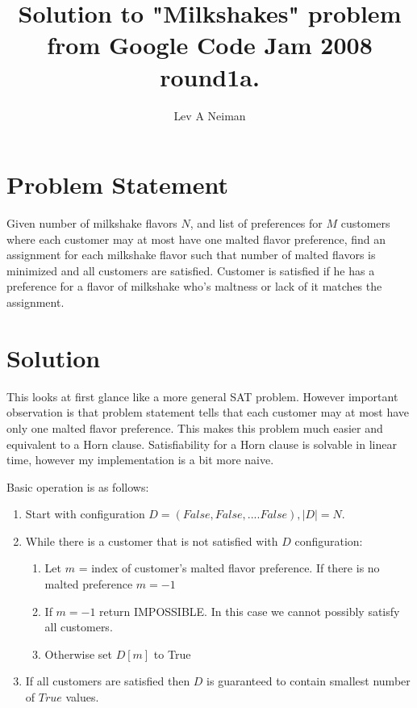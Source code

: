 \documentclass[11pt]{article}
\begin{document}
\title{Solution to "Milkshakes"\cite{milkshakes} problem from Google Code Jam 2008 round1a.}
\author{Lev A Neiman}
\maketitle

\section{Problem Statement}

Given number of milkshake flavors $N$, and list of preferences for $M$ customers where each customer may at most have one malted flavor preference, find an assignment for each milkshake flavor such that number of malted flavors is minimized and all customers are satisfied.  Customer is satisfied if he has a preference for a flavor of milkshake who's maltness or lack of it matches the assignment.  

\section{Solution}

This looks at first glance like a more general SAT problem\cite{SAT}.  However important observation is that problem statement tells that each customer may at most have only one malted flavor preference.  This makes this problem much easier and equivalent to a Horn clause\cite{horn}.  Satisfiability for a Horn clause is solvable in linear time, however my implementation is a bit more naive.

Basic operation is as follows:
\begin{enumerate}
\item Start with configuration $D=(False,False,....False), |D|=N$.
\item While there is a customer that is not satisfied with $D$ configuration:
\begin{enumerate}
\item Let $m$ = index of customer's malted flavor preference.  If there is no malted preference $m=-1$
\item If $m=-1$ return IMPOSSIBLE.  In this case we cannot possibly satisfy all customers.
\item Otherwise set $D[m]$ to True
\end{enumerate} 
\item If all customers are satisfied then $D$ is guaranteed to contain smallest number of $True$ values.
\end{enumerate}
\end{document}
